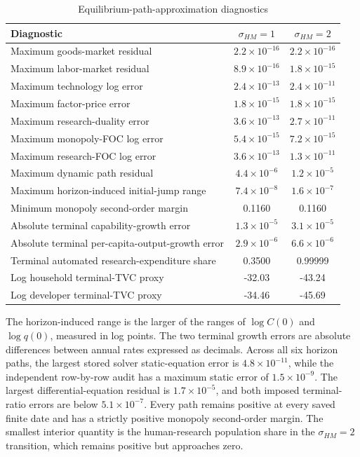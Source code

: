\begin{table}[H]
\centering
\small
\caption{Equilibrium-path-approximation diagnostics}
\label{tab:axm-residuals}
\begin{tabular}{lcc}
\toprule
Diagnostic & \(\sigma_{HM}=1\) & \(\sigma_{HM}=2\)\\
\midrule
Maximum goods-market residual & \(2.2\times10^{-16}\) & \(2.2\times10^{-16}\)\\
Maximum labor-market residual & \(8.9\times10^{-16}\) & \(1.8\times10^{-15}\)\\
Maximum technology log error & \(2.4\times10^{-13}\) & \(2.4\times10^{-11}\)\\
Maximum factor-price error & \(1.8\times10^{-15}\) & \(1.8\times10^{-15}\)\\
Maximum research-duality error & \(3.6\times10^{-13}\) & \(2.7\times10^{-11}\)\\
Maximum monopoly-FOC log error & \(5.4\times10^{-15}\) & \(7.2\times10^{-15}\)\\
Maximum research-FOC log error & \(3.6\times10^{-13}\) & \(1.3\times10^{-11}\)\\
Maximum dynamic path residual & \(4.4\times10^{-6}\) & \(1.2\times10^{-5}\)\\
 Maximum horizon-induced initial-jump range & \(7.4\times10^{-8}\) & \(1.6\times10^{-7}\)\\
Minimum monopoly second-order margin & 0.1160 & 0.1160\\
 Absolute terminal capability-growth error & \(1.3\times10^{-5}\) & \(3.1\times10^{-5}\)\\
 Absolute terminal per-capita-output-growth error & \(2.9\times10^{-6}\) & \(6.6\times10^{-6}\)\\
Terminal automated research-expenditure share & 0.3500 & 0.99999\\
Log household terminal-TVC proxy & -32.03 & -43.24\\
Log developer terminal-TVC proxy & -34.46 & -45.69\\
\bottomrule
\end{tabular}
\end{table}

The horizon-induced range is the larger of the ranges of \(\log C(0)\) and
\(\log q(0)\), measured in log points. The two terminal growth errors are
absolute differences between annual rates expressed as decimals.
Across all six horizon paths, the largest stored solver static-equation error is
\(4.8\times10^{-11}\), while the independent row-by-row audit has a maximum
static error of \(1.5\times10^{-9}\). The largest differential-equation residual is
\(1.7\times10^{-5}\), and both imposed terminal-ratio errors are below
\(5.1\times10^{-7}\). Every path remains positive at every saved finite date and
has a strictly positive monopoly second-order margin. The smallest interior
quantity is the human-research population share in the
\(\sigma_{HM}=2\) transition, which remains positive but approaches zero.

